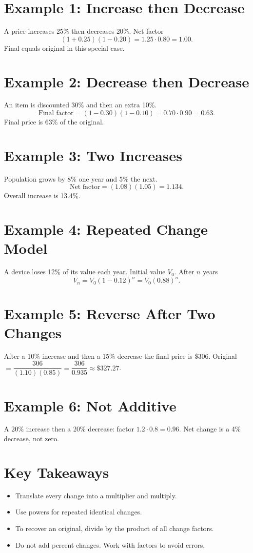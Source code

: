 \documentclass[14pt]{extarticle}
\begin{document}
\section*{Example 1: Increase then Decrease}

A price increases 25\% then decreases 20\%. Net factor
\[
(1+0.25)(1-0.20)=1.25\cdot0.80=1.00.
\]
Final equals original in this special case.

\section*{Example 2: Decrease then Decrease}

An item is discounted 30\% and then an extra 10\%.  
\[
\text{Final factor}=(1-0.30)(1-0.10)=0.70\cdot0.90=0.63.
\]
Final price is 63\% of the original.

\section*{Example 3: Two Increases}

Population grows by 8\% one year and 5\% the next.
\[
\text{Net factor}=(1.08)(1.05)=1.134.
\]
Overall increase is 13.4\%.

\section*{Example 4: Repeated Change Model}

A device loses 12\% of its value each year. Initial value \(V_0\). After \(n\) years
\[
V_n=V_0(1-0.12)^n=V_0(0.88)^n.
\]

\section*{Example 5: Reverse After Two Changes}

After a 10\% increase and then a 15\% decrease the final price is \$306.  
Original \(=\dfrac{306}{(1.10)(0.85)}=\dfrac{306}{0.935}\approx \$327.27\).

\section*{Example 6: Not Additive}

A 20\% increase then a 20\% decrease: factor \(1.2\cdot0.8=0.96\).  
Net change is a 4\% decrease, not zero.

\section*{Key Takeaways}
\begin{itemize}
  \item Translate every change into a multiplier and multiply.
  \item Use powers for repeated identical changes.
  \item To recover an original, divide by the product of all change factors.
  \item Do not add percent changes. Work with factors to avoid errors.
\end{itemize}
\end{document}
